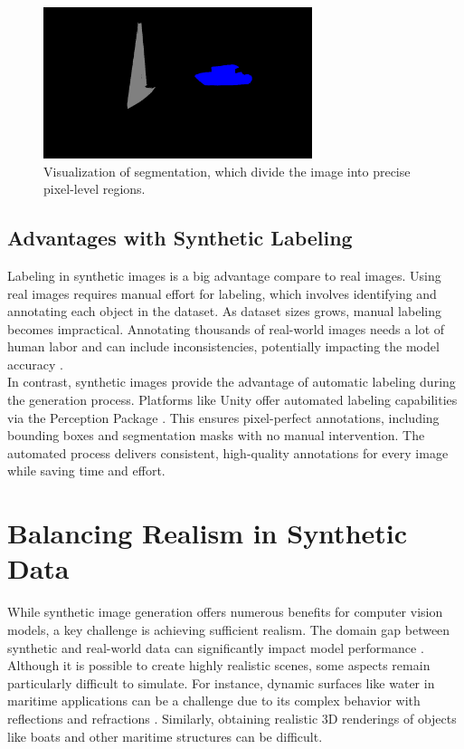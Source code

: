 \begin{figure}[H]
    \centering
    \includegraphics[width=0.7\textwidth]{Figures/segmentation_2.png}
    \caption{Visualization of segmentation, which divide the image into precise pixel-level regions.}
    \label{fig:image3}
\end{figure}



\subsection{Advantages with Synthetic Labeling}
Labeling in synthetic images is a big advantage compare to real images. Using real images requires manual effort for labeling, which involves identifying and annotating each object in the dataset. As dataset sizes grows, manual labeling becomes impractical. Annotating thousands of real-world images needs a lot of human labor and can include inconsistencies, potentially impacting the model accuracy \cite{nikolenko2021synthetic}.\\

\noindent In contrast, synthetic images provide the advantage of automatic labeling during the generation process. Platforms like Unity offer automated labeling capabilities via the Perception Package \cite{unity-perception2022}. This ensures pixel-perfect annotations, including bounding boxes and segmentation masks with no manual intervention. The automated process delivers consistent, high-quality annotations for every image while saving time and effort.


\section{Balancing Realism in Synthetic Data}
While synthetic image generation offers numerous benefits for computer vision models, a key challenge is achieving sufficient realism. The domain gap between synthetic and real-world data can significantly impact model performance \cite{nikolenko2021synthetic}.  Although it is possible to create highly realistic scenes, some aspects remain particularly difficult to simulate. For instance, dynamic surfaces like water in maritime applications can be a challenge due to its complex behavior with reflections and refractions \cite{waterrendering}. Similarly, obtaining realistic 3D renderings of objects like boats and other maritime structures can be difficult.\\

